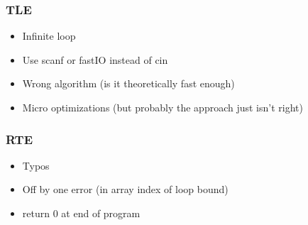 \documentclass[
	a4paper,
	landscape,
	twoside,
	10pt,
	article
]{article}
\begin{document}
\subsubsection*{TLE}
\begin{itemize}
	\setlength\itemsep{0em}
	\item Infinite loop
	\item Use scanf or fastIO instead of cin
	\item Wrong algorithm (is it theoretically fast enough)
	\item Micro optimizations (but probably the approach just isn't right)
\end{itemize}

\subsubsection*{RTE}
\begin{itemize}
	\setlength\itemsep{0em}
	\item Typos
	\item Off by one error (in array index of loop bound)
	\item return 0 at end of program
\end{itemize}
\end{document}
